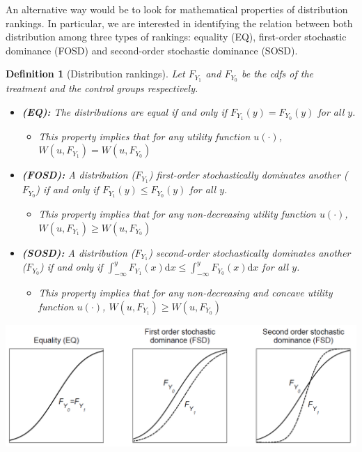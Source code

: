 \documentclass[12pt]{report}
\def\D{\mathrm{d}}
\newtheorem{definition}{Definition}[chapter]
\def\D{\mathrm{d}}
\def\D{\mathrm{d}}
\begin{document}
An alternative way would be to look for mathematical properties of distribution rankings. In particular, we are interested in identifying the relation between both distribution among three types of rankings: equality (EQ), first-order stochastic dominance (FOSD) and second-order stochastic dominance (SOSD).
\begin{definition}[Distribution rankings]
Let $F_{Y_1}$ and $F_{Y_0}$ be the cdfs of the treatment and the control groups respectively.\begin{itemize}
\item\textbf{(EQ):} The distributions are equal if and only if $F_{Y_1}(y) = F_{Y_0}(y)$ for all $y$.
\begin{itemize}
\item[$\Rightarrow$] This property implies that for any utility function $u(\cdot)$, $W(u, F_{Y_1})= W(u, F_{Y_0})$
\end{itemize}
\item\textbf{(FOSD):} A distribution ($F_{Y_1}$) first-order stochastically dominates another ($F_{Y_0}$) if and only if $F_{Y_1}(y) \leq F_{Y_0}(y)$ for all $y$.
\begin{itemize}
\item[$\Rightarrow$] This property implies that for any non-decreasing utility function $u(\cdot)$, $W(u, F_{Y_1})\geq W(u, F_{Y_0})$
\end{itemize}
\item\textbf{(SOSD):} A distribution ($F_{Y_1}$) second-order stochastically dominates another ($F_{Y_0}$) if and only if $\int_{-\infty}^{y} F_{Y_1}(x)\D x \leq \int_{-\infty}^{y} F_{Y_0}(x)\D x$ for all $y$.
\begin{itemize}
\item[$\Rightarrow$] This property implies that for any non-decreasing and concave utility function $u(\cdot)$, $W(u, F_{Y_1})\geq W(u, F_{Y_0})$
\end{itemize}
\end{itemize}
\end{definition}

\begin{center}
\includegraphics[scale=0.42]{images/distcompare.PNG} 
\end{center}
\end{document}
